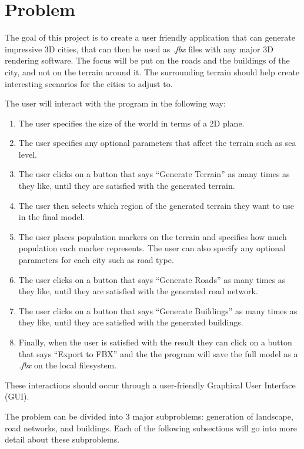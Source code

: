 \section{Problem}

The goal of this project is to create a user friendly application that can
generate impressive 3D cities, that can then be used as \textit{.fbx} files with
any major 3D rendering software.
The focus will be put on the roads and the buildings of the city, and not on the
terrain around it. The surrounding terrain should help create interesting scenarios for the cities to adjust to.

The user will interact with the program in the following way:
\begin{enumerate}
  \item The user specifies the size of the world in terms of a 2D plane.
  \item The user specifies any optional parameters that affect the terrain
    such as sea level.
  \item The user clicks on a button that says ``Generate Terrain'' as many times
    as they like, until they are satisfied with the generated terrain.
  \item The user then selects which region of the generated terrain they want to use in the final model.
  \item The user places population markers on the terrain and specifies how much
    population each marker represents. The user can also specify any optional
    parameters for each city such as road type.
  \item The user clicks on a button that says ``Generate Roads'' as many times
    as they like, until they are satisfied with the generated road network.
  \item The user clicks on a button that says ``Generate Buildings'' as many times
    as they like, until they are satisfied with the generated buildings.
  \item Finally, when the user is satisfied with the result they can click on a
    button that says ``Export to FBX'' and the the program will save the full
    model as a \textit{.fbx} on the local filesystem.
\end{enumerate}
These interactions should occur through a user-friendly Graphical User Interface
(GUI).

The problem can be divided into 3 major subproblems: generation of landscape, road networks, and buildings.
Each of the following subsections will go into more detail about these subproblems.

